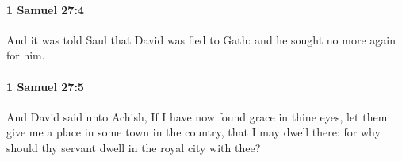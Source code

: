 		\paragraph{1 Samuel 27:4} %
			\label{1SAMUEL-27-4}

			And it was told Saul that David was fled to Gath: and he sought no more again for him.


		\paragraph{1 Samuel 27:5} %
			\label{1SAMUEL-27-5}

			And David said unto Achish, If I have now found grace in thine eyes, let them give me a place in some town in the country, that I may dwell there: for why should thy servant dwell in the royal city with thee?


